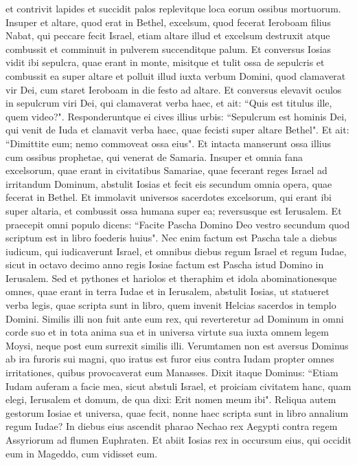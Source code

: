 \begin{biblechapter}
\verse et contrivit lapides et succidit palos replevitque loca eorum ossibus mortuorum. 
\verse Insuper et altare, quod erat in Bethel, excelsum, quod fecerat Ieroboam filius Nabat, qui peccare fecit Israel, etiam altare illud et excelsum destruxit atque combussit et comminuit in pulverem succenditque palum. 
\verse Et conversus Iosias vidit ibi sepulcra, quae erant in monte, misitque et tulit ossa de sepulcris et combussit ea super altare et polluit illud iuxta verbum Domini, quod clamaverat vir Dei, cum staret Ieroboam in die festo ad altare. Et conversus elevavit oculos in sepulcrum viri Dei, qui clamaverat verba haec,  
\verse et ait: “Quis est titulus ille, quem video?". Responderuntque ei cives illius urbis: “Sepulcrum est hominis Dei, qui venit de Iuda et clamavit verba haec, quae fecisti super altare Bethel". 
\verse Et ait: “Dimittite eum; nemo commoveat ossa eius". Et intacta manserunt ossa illius cum ossibus prophetae, qui venerat de Samaria. 
\verse Insuper et omnia fana excelsorum, quae erant in civitatibus Samariae, quae fecerant reges Israel ad irritandum Dominum, abstulit Iosias et fecit eis secundum omnia opera, quae fecerat in Bethel. 
\verse Et immolavit universos sacerdotes excelsorum, qui erant ibi super altaria, et combussit ossa humana super ea; reversusque est Ierusalem. 
\verse Et praecepit omni populo dicens: “Facite Pascha Domino Deo vestro secundum quod scriptum est in libro foederis huius". 
\verse Nec enim factum est Pascha tale a diebus iudicum, qui iudicaverunt Israel, et omnibus diebus regum Israel et regum Iudae, 
\verse sicut in octavo decimo anno regis Iosiae factum est Pascha istud Domino in Ierusalem. 
\verse Sed et pythones et hariolos et theraphim et idola abominationesque omnes, quae erant in terra Iudae et in Ierusalem, abstulit Iosias, ut statueret verba legis, quae scripta sunt in libro, quem invenit Helcias sacerdos in templo Domini. 
\verse Similis illi non fuit ante eum rex, qui reverteretur ad Dominum in omni corde suo et in tota anima sua et in universa virtute sua iuxta omnem legem Moysi, neque post eum surrexit similis illi. 
\verse Verumtamen non est aversus Dominus ab ira furoris sui magni, quo iratus est furor eius contra Iudam propter omnes irritationes, quibus provocaverat eum Manasses. 
\verse Dixit itaque Dominus: “Etiam Iudam auferam a facie mea, sicut abstuli Israel, et proiciam civitatem hanc, quam elegi, Ierusalem et domum, de qua dixi: Erit nomen meum ibi". 
\verse Reliqua autem gestorum Iosiae et universa, quae fecit, nonne haec scripta sunt in libro annalium regum Iudae? 
\verse In diebus eius ascendit pharao Nechao rex Aegypti contra regem Assyriorum ad flumen Euphraten. Et abiit Iosias rex in occursum eius, qui occidit eum in Mageddo, cum vidisset eum. 

\end{biblechapter}
